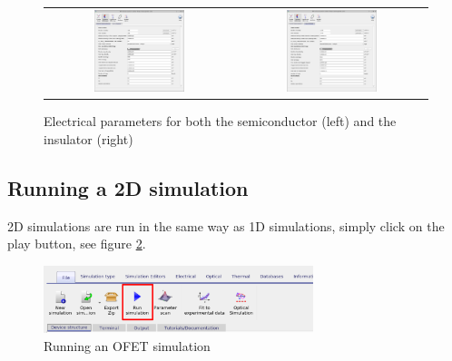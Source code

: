 \begin{figure}[H]
\centering
\begin{tabular}{ c c }

\includegraphics[width=0.5\textwidth,height=0.4\textwidth]{./images/ofet_5.png}

&
\includegraphics[width=0.5\textwidth,height=0.4\textwidth]{./images/ofet_6.png}
\\
\end{tabular}
\caption{Electrical parameters for both the semiconductor (left) and the insulator (right)}
\label{fig:ofetelectricalparamters}
\end{figure}

\subsection{Running a 2D simulation}

2D simulations are run in the same way as 1D simulations, simply click on the play button, see figure \ref{fig:ofetrun}.
\begin{figure}[H]
\centering
\includegraphics[width=0.7\textwidth]{./images/run_sim.png}
\caption{Running an OFET simulation}
\label{fig:ofetrun}
\end{figure}

